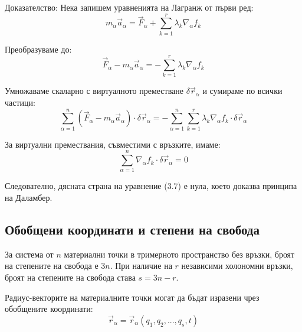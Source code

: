 \documentclass{report}
\begin{document}

Доказателство: Нека запишем уравненията на Лагранж от първи ред:
\begin{equation}
m_\alpha \vec{a}_\alpha = \vec{F}_\alpha + \sum_{k=1}^{r} \lambda_k \nabla_\alpha f_k
\end{equation}

Преобразуваме до:
\begin{equation}
\vec{F}_\alpha - m_\alpha \vec{a}_\alpha = - \sum_{k=1}^{r} \lambda_k \nabla_\alpha f_k
\end{equation}

Умножаваме скаларно с виртуалното преместване $\delta \vec{r}_\alpha$ и сумираме по всички частици:
\begin{equation}
\sum_{\alpha=1}^{n} (\vec{F}_\alpha - m_\alpha \vec{a}_\alpha) \cdot \delta \vec{r}_\alpha = - \sum_{\alpha=1}^{n} \sum_{k=1}^{r} \lambda_k \nabla_\alpha f_k \cdot \delta \vec{r}_\alpha
\end{equation}

За виртуални премествания, съвместими с връзките, имаме:
\begin{equation}
\sum_{\alpha=1}^{n} \nabla_\alpha f_k \cdot \delta \vec{r}_\alpha = 0
\end{equation}

Следователно, дясната страна на уравнение (3.7) е нула, което доказва принципа на Даламбер.

\subsection{Обобщени координати и степени на свобода}


За система от $n$ материални точки в тримерното пространство без връзки, броят на степените на свобода е $3n$. При наличие на $r$ независими холономни връзки, броят на степените на свобода става $s = 3n - r$.


Радиус-векторите на материалните точки могат да бъдат изразени чрез обобщените координати:
\begin{equation}
\vec{r}_\alpha = \vec{r}_\alpha(q_1, q_2, ..., q_s, t)
\end{equation}
\end{document}
